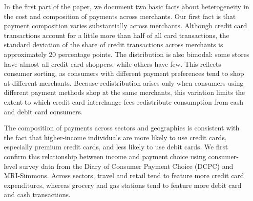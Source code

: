 \documentclass[main.tex]{subfiles}
\begin{document}
In the first part of the paper, we document two basic facts about heterogeneity in the cost and composition of payments across merchants.
Our first fact is that payment composition varies substantially across merchants.
Although credit card transactions account for a little more than half of all card transactions, the standard deviation of the share of credit transactions across merchants is approximately 20 percentage points.
The distribution is also bimodal: some stores have almost all credit card shoppers, while others have few.
This reflects consumer sorting, as consumers with different payment preferences tend to shop at different merchants.
Because redistribution arises only when consumers using different payment methods shop at the same merchants, this variation limits the extent to which credit card interchange fees redistribute consumption from cash and debit card consumers.

The composition of payments across sectors and geographies is consistent with the fact that higher-income individuals are more likely to use credit cards, especially premium credit cards, and less likely to use debit cards.
We first confirm this relationship between income and payment choice using consumer-level survey data from the Diary of Consumer Payment Choice (DCPC) and MRI-Simmons.
Across sectors, travel and retail tend to feature more credit card expenditures, whereas grocery and gas stations tend to feature more debit card and cash transactions.

\end{document}
